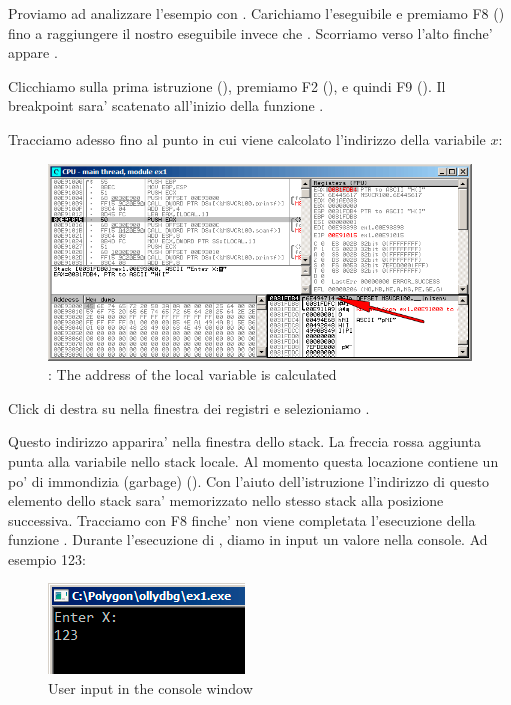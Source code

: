 \clearpage
{}
\myindex{\olly}

Proviamo ad analizzare l'esempio con \olly.
Carichiamo l'eseguibile e premiamo F8 (\stepover) fino a raggiungere il nostro eseguibile invece che .
Scorriamo verso l'alto finche' appare \main .

Clicchiamo sulla prima istruzione (), premiamo F2 (), e quindi F9 ().
Il breakpoint sara' scatenato all'inizio della funzione \main .

Tracciamo adesso fino al punto in cui viene calcolato l'indirizzo della variabile $x$:

\begin{figure}[H]
\centering
\includegraphics[scale=\FigScale]{patterns/04_scanf/1_simple/ex1_olly_1.png}
\caption{\olly: The address of the local variable is calculated}
\label{fig:scanf_ex1_olly_1}
\end{figure}


Click di destra su \EAX nella finestra dei registri e selezioniamo .

Questo indirizzo apparira' nella finestra dello stack.
La freccia rossa aggiunta punta alla variabile nello stack locale.
Al momento questa locazione contiene un po' di immondizia (garbage) ().
Con l'aiuto dell'istruzione \PUSH l'indirizzo di questo elemento dello stack sara' memorizzato nello stesso stack alla posizione successiva.
Tracciamo con F8 finche' non viene completata l'esecuzione della funzione \scanf.
Durante l'esecuzione di \scanf, diamo in input un valore nella console. Ad esempio 123:

\begin{figure}[H]
\centering
\includegraphics[scale=\NormalScale]{patterns/04_scanf/1_simple/ex1_olly_2.png}
\caption{User input in the console window}
\label{fig:scanf_ex1_olly_2}
\end{figure}

